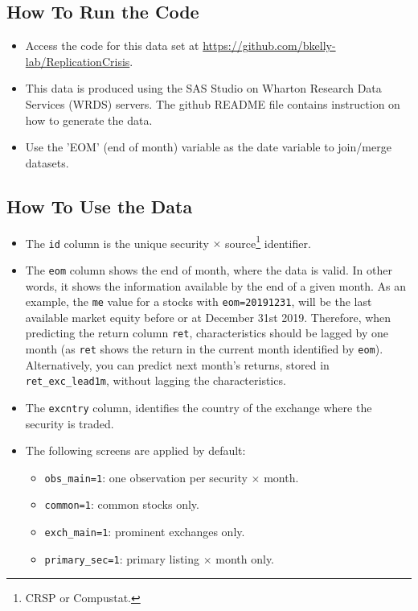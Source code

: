 \documentclass[12pt,title,fleqn]{article}
\begin{document}
\subsection{How To Run the Code}
    \begin{itemize}
    \item Access the code for this data set at \url{https://github.com/bkelly-lab/ReplicationCrisis}.
    \item This data is produced using the SAS Studio on Wharton Research Data Services (WRDS) servers. The github README file contains instruction on how to generate the data.
    \item Use the 'EOM' (end of month) variable as the date variable to join/merge datasets.
\end{itemize}

\subsection{How To Use the Data}
\begin{itemize}
	\item The \texttt{id} column is the unique security $\times$ source\footnote{CRSP or Compustat.} identifier.
	\item The \texttt{eom} column shows the end of month, where the data is valid. In other words, it shows the information available by the end of a given month. As an example, the \texttt{me} value for a stocks with \texttt{eom=20191231}, will be the last available market equity before or at December 31st 2019. Therefore, when predicting the return column \texttt{ret}, characteristics should be lagged by one month (as \texttt{ret} shows the return in the current month identified by \texttt{eom}). Alternatively, you can predict next month’s returns, stored in \texttt{ret\_exc\_lead1m}, without lagging the characteristics.
	\item The \texttt{excntry} column, identifies the country of the exchange where the security is traded.
	\item The following screens are applied by default:
	\begin{itemize}
		\item \texttt{obs\_main=1}: one observation per security $\times$ month.
		\item \texttt{common=1}: common stocks only.
		\item \texttt{exch\_main=1}: prominent exchanges only.
		\item \texttt{primary\_sec=1}: primary listing $\times$ month only.
	\end{itemize}  
	
\end{itemize}
\end{document}
